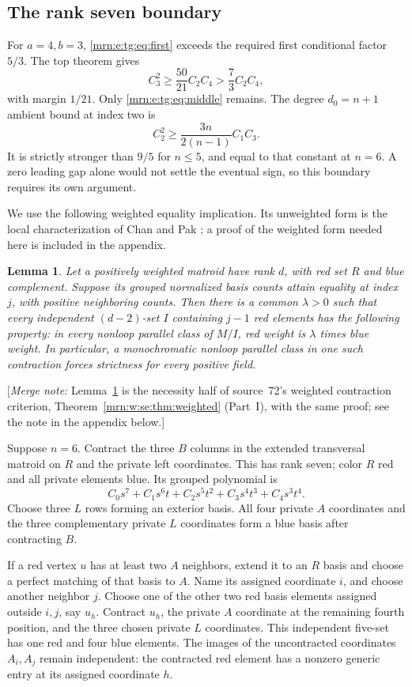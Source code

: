 \documentclass[11pt,a4paper]{article}
\newtheorem{lemma}[theorem]{Lemma}
\theoremstyle{remark}\newtheorem{remark}[theorem]{Remark}
\newcommand{\mnote}[1]{[\textit{Merge note:} #1]}
\begin{document}
\subsection{The rank seven boundary}
For $a=4,b=3$, \eqref{mrn:e:tg:eq:first} exceeds the required first conditional factor $5/3$. The top theorem gives
\[
 C_3^2\ge\frac{50}{21}C_2C_4>\frac73C_2C_4,
\]
with margin $1/21$. Only \eqref{mrn:e:tg:eq:middle} remains. The degree $d_0=n+1$ ambient bound at index two is
\begin{equation}\label{mrn:e:tg:eq:ambientmiddle}
 C_2^2\ge\frac{3n}{2(n-1)}C_1C_3.
\end{equation}
It is strictly stronger than $9/5$ for $n\le5$, and equal to that constant at $n=6$. A zero leading gap alone would not settle the eventual sign, so this boundary requires its own argument.

We use the following weighted equality implication. Its unweighted form is the local characterization of Chan and Pak \cite[Theorem 1.3]{b:CP}; a proof of the weighted form needed here is included in the appendix.
\begin{lemma}\label{mrn:e:tg:lem:strict}
Let a positively weighted matroid have rank $d$, with red set $R$ and blue complement. Suppose its grouped normalized basis counts attain equality at index $j$, with positive neighboring counts. Then there is a common $\lambda>0$ such that every independent $(d-2)$-set $I$ containing $j-1$ red elements has the following property: in every nonloop parallel class of $M/I$, red weight is $\lambda$ times blue weight. In particular, a monochromatic nonloop parallel class in one such contraction forces strictness for every positive field.
\end{lemma}
\mnote{Lemma~\ref{mrn:e:tg:lem:strict} is the necessity half of source~72's weighted contraction criterion, Theorem~\ref{mrn:w:se:thm:weighted} (Part~I), with the same proof; see the note in the appendix below.}

Suppose $n=6$. Contract the three $B$ columns in the extended transversal matroid on $R$ and the private left coordinates. This has rank seven; color $R$ red and all private elements blue. Its grouped polynomial is
\[
 C_0s^7+C_1s^6t+C_2s^5t^2+C_3s^4t^3+C_4s^3t^4.
\]
Choose three $L$ rows forming an exterior basis. All four private $A$ coordinates and the three complementary private $L$ coordinates form a blue basis after contracting $B$.

If a red vertex $u$ has at least two $A$ neighbors, extend it to an $R$ basis and choose a perfect matching of that basis to $A$. Name its assigned coordinate $i$, and choose another neighbor $j$. Choose one of the other two red basis elements assigned outside $i,j$, say $u_h$. Contract $u_h$, the private $A$ coordinate at the remaining fourth position, and the three chosen private $L$ coordinates. This independent five-set has one red and four blue elements. The images of the uncontracted coordinates $A_i,A_j$ remain independent: the contracted red element has a nonzero generic entry at its assigned coordinate $h$.
\end{document}
